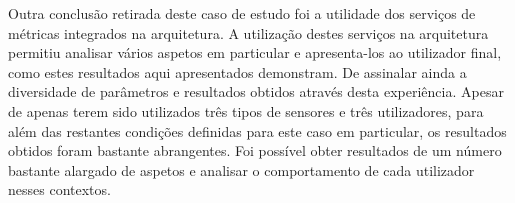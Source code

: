 Outra conclusão retirada deste caso de estudo foi a utilidade dos serviços de métricas integrados na arquitetura. A utilização destes serviços na arquitetura permitiu analisar vários aspetos em particular e apresenta-los ao utilizador final, como estes resultados aqui apresentados demonstram. De assinalar ainda a diversidade de parâmetros e resultados obtidos através desta experiência. Apesar de apenas terem sido utilizados três tipos de sensores e três utilizadores, para além das restantes condições definidas para este caso em particular, os resultados obtidos foram bastante abrangentes. Foi possível obter resultados de um número bastante alargado de aspetos e analisar o comportamento de cada utilizador nesses contextos.
